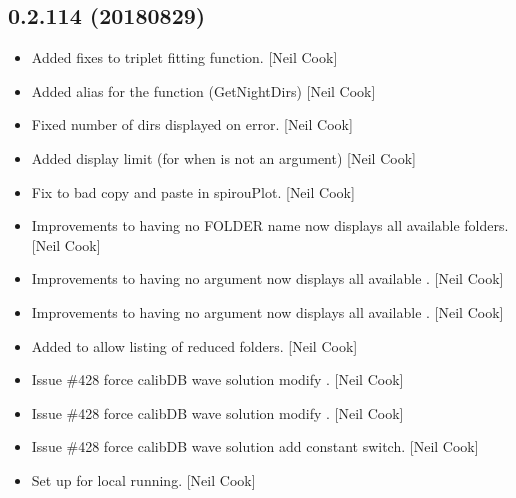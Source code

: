 \documentclass[a4paper,10pt,english]{report}
\begin{document}
\subsection{0.2.114 (2018\sphinxhyphen{}08\sphinxhyphen{}29)}
\label{\detokenize{misc/changelog:id365}}\begin{itemize}
\item {} 
Added fixes to triplet fitting function. {[}Neil Cook{]}

\item {} 
Added alias for the  function (GetNightDirs) {[}Neil Cook{]}

\item {} 
Fixed number of  dirs displayed on error. {[}Neil Cook{]}

\item {} 
Added  display limit (for when  is not an
argument) {[}Neil Cook{]}

\item {} 
Fix to bad copy and paste in spirouPlot. {[}Neil Cook{]}

\item {} 
Improvements to having no FOLDER name \sphinxhyphen{} now displays all available
folders. {[}Neil Cook{]}

\item {} 
Improvements to  \sphinxhyphen{} having no  argument now
displays all available . {[}Neil Cook{]}

\item {} 
Improvements to  \sphinxhyphen{} having no  argument now
displays all available . {[}Neil Cook{]}

\item {} 
Added  to allow listing of reduced folders.
{[}Neil Cook{]}

\item {} 
Issue \#428 \sphinxhyphen{} force calibDB wave solution \sphinxhyphen{} modify . {[}Neil
Cook{]}

\item {} 
Issue \#428 \sphinxhyphen{} force calibDB wave solution \sphinxhyphen{} modify .
{[}Neil Cook{]}

\item {} 
Issue \#428 \sphinxhyphen{} force calibDB wave solution \sphinxhyphen{} add constant switch. {[}Neil
Cook{]}

\item {} 
 \sphinxhyphen{} Set up for local running. {[}Neil Cook{]}

\end{itemize}
\end{document}
